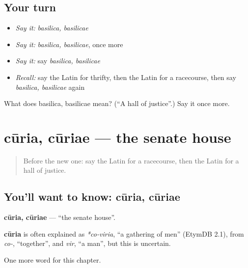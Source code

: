 \subsection*{Your turn}
\begin{itemize}
\raggedright
  \item \emph{Say it:} \emph{basilica, basilicae}
  \item \emph{Say it:} \emph{basilica, basilicae}, once more
  \item \emph{Say it:} say \emph{basilica, basilicae}
  \item \emph{Recall:} say the Latin for thrifty, then the Latin for a racecourse, then say \emph{basilica, basilicae} again
\end{itemize}

\begin{tcolorbox}[breakable,colback=teal!4,colframe=teal!35!black,title={Before you move on}]
What does basilica, basilicae mean? (\textquotedblleft{}A hall of justice\textquotedblright{}.) Say it once more.
\end{tcolorbox}
\section[cūria, cūriae]{cūria, cūriae — the senate house}

\label{lesson:LA-C270-curia}



\begin{quote}
Before the new one: say the Latin for a racecourse, then the Latin for a hall of justice.
\end{quote}

\subsection*{You'll want to know: cūria, cūriae}
\textbf{cūria, cūriae} — \textquotedblleft{}the senate house\textquotedblright{}.

\begin{cousinweb}
\textbf{cūria} is often explained as \emph{*co-viria}, \textquotedblleft{}a gathering of men\textquotedblright{} (EtymDB 2.1), from \emph{co-}, \textquotedblleft{}together\textquotedblright{}, and \emph{vir}, \textquotedblleft{}a man\textquotedblright{}, but this is uncertain.
\end{cousinweb}

\begin{grammarlens}[title={What you've built}]
One more word for this chapter.
\end{grammarlens}

